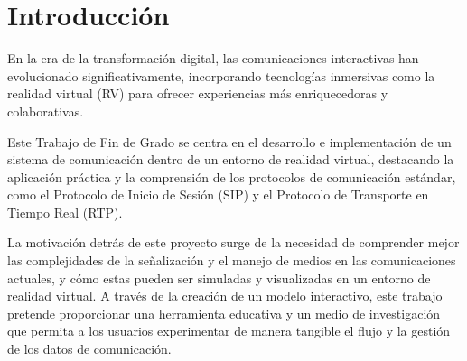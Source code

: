 \documentclass[a4paper, 12pt]{book}
\begin{document}

\tableofcontents 
\cleardoublepage
\listoffigures %



\cleardoublepage
\chapter{Introducción}
\label{sec:intro} %
En la era de la transformación digital, las comunicaciones interactivas han evolucionado significativamente, 
incorporando tecnologías inmersivas como la realidad virtual (RV) para ofrecer experiencias más enriquecedoras y colaborativas. 

\bigskip

Este Trabajo de Fin de Grado se centra en el desarrollo e implementación de un sistema de comunicación dentro de un entorno de realidad virtual, 
destacando la aplicación práctica y la comprensión de los protocolos de comunicación estándar, 
como el Protocolo de Inicio de Sesión (SIP) y el Protocolo de Transporte en Tiempo Real (RTP).

\bigskip

La motivación detrás de este proyecto surge de la necesidad de comprender mejor las complejidades de la señalización y 
el manejo de medios en las comunicaciones actuales, y cómo estas pueden ser simuladas y visualizadas en un entorno de realidad virtual. 
A través de la creación de un modelo interactivo, este trabajo pretende proporcionar una herramienta educativa y un medio de 
investigación que permita a los usuarios experimentar de manera tangible el flujo y la gestión de los datos de comunicación.
\end{document}
